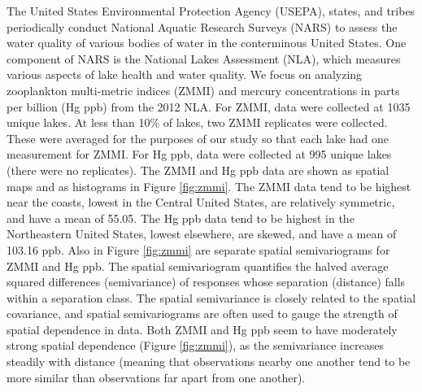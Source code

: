 \documentclass[]{elsarticle} %
\begin{document}
The United States Environmental Protection Agency (USEPA), states, and
tribes periodically conduct National Aquatic Research Surveys (NARS) to
assess the water quality of various bodies of water in the conterminous
United States. One component of NARS is the National Lakes Assessment
(NLA), which measures various aspects of lake health and water quality.
We focus on analyzing zooplankton multi-metric indices (ZMMI) and
mercury concentrations in parts per billion (Hg ppb) from the 2012 NLA.
For ZMMI, data were collected at 1035 unique lakes. At less than 10\% of
lakes, two ZMMI replicates were collected. These were averaged for the
purposes of our study so that each lake had one measurement for ZMMI.
For Hg ppb, data were collected at 995 unique lakes (there were no
replicates). The ZMMI and Hg ppb data are shown as spatial maps and as
histograms in Figure \ref{fig:zmmi}. The ZMMI data tend to be highest
near the coasts, lowest in the Central United States, are relatively
symmetric, and have a mean of 55.05. The Hg ppb data tend to be highest
in the Northeastern United States, lowest elsewhere, are skewed, and
have a mean of 103.16 ppb. Also in Figure \ref{fig:zmmi} are separate
spatial semivariograms for ZMMI and Hg ppb. The spatial semivariogram
quantifies the halved average squared differences (semivariance) of
responses whose separation (distance) falls within a separation class.
The spatial semivariance is closely related to the spatial covariance,
and spatial semivariograms are often used to gauge the strength of
spatial dependence in data. Both ZMMI and Hg ppb seem to have moderately
strong spatial dependence (Figure \ref{fig:zmmi}), as the semivariance
increases steadily with distance (meaning that observations nearby one
another tend to be more similar than observations far apart from one
another).
\end{document}
